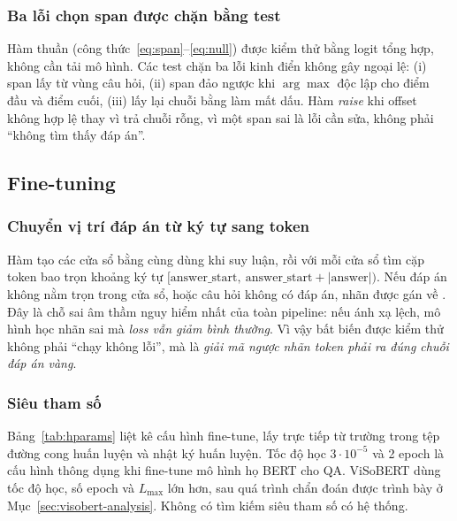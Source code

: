 \subsubsection{Ba lỗi chọn span được chặn bằng test}

Hàm thuần  (công thức~\eqref{eq:span}--\eqref{eq:null}) được kiểm
thử bằng logit tổng hợp, không cần tải mô hình. Các test chặn ba lỗi kinh điển không gây
ngoại lệ: (i) span lấy từ vùng câu hỏi, (ii) span đảo ngược khi $\arg\max$ độc lập cho
điểm đầu và điểm cuối, (iii) lấy lại chuỗi bằng  làm mất dấu. Hàm
 \emph{raise} khi offset không hợp lệ thay vì trả chuỗi rỗng, vì một
span sai là lỗi cần sửa, không phải ``không tìm thấy đáp án''.

\subsection{Fine-tuning}
\label{sec:finetune}

\subsubsection{Chuyển vị trí đáp án từ ký tự sang token}

Hàm  tạo các cửa sổ bằng cùng  dùng khi
suy luận, rồi với mỗi cửa sổ tìm cặp token bao trọn khoảng ký tự
$[\text{answer\_start},\ \text{answer\_start} + |\text{answer}|)$. Nếu đáp án không nằm trọn
trong cửa sổ, hoặc câu hỏi không có đáp án, nhãn được gán về \code{[CLS]}. Đây là chỗ sai
âm thầm nguy hiểm nhất của toàn pipeline: nếu ánh xạ lệch, mô hình học nhãn sai mà
\emph{loss vẫn giảm bình thường}. Vì vậy bất biến được kiểm thử không phải ``chạy không
lỗi'', mà là \emph{giải mã ngược nhãn token phải ra đúng chuỗi đáp án vàng}.

\subsubsection{Siêu tham số}

Bảng~\ref{tab:hparams} liệt kê cấu hình fine-tune, lấy trực tiếp từ trường 
trong tệp đường cong huấn luyện và nhật ký huấn luyện. Tốc độ học $3\cdot10^{-5}$ và 2 epoch
là cấu hình thông dụng khi fine-tune mô hình họ BERT cho QA. ViSoBERT dùng tốc độ học, số
epoch và $L_{\max}$ lớn hơn, sau quá trình chẩn đoán được trình bày ở
Mục~\ref{sec:visobert-analysis}. Không có tìm kiếm siêu tham số có hệ thống.

